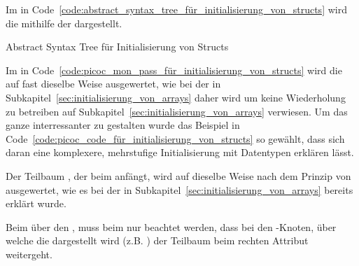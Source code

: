 Im  in Code~\ref{code:abstract_syntax_tree_für_initialisierung_von_structs} wird die   mithilfe der   dargestellt.

\begin{code}
  \centering
  \caption{Abstract Syntax Tree für Initialisierung von Structs}
  \label{code:abstract_syntax_tree_für_initialisierung_von_structs}
\end{code}


Im  in Code~\ref{code:picoc_mon_pass_für_initialisierung_von_structs} wird die   auf fast dieselbe Weise ausgewertet, wie bei der  in Subkapitel~\ref{sec:initialisierung_von_arrays} daher wird um keine Wiederholung zu betreiben auf Subkapitel~\ref{sec:initialisierung_von_arrays} verwiesen. Um das ganze interressanter zu gestalten wurde das Beispiel in Code~\ref{code:picoc_code_für_initialisierung_von_structs} so gewählt, dass sich daran eine komplexere, mehrstufige Initialisierung mit  Datentypen erklären lässt.

Der  Teilbaum , der beim   anfängt, wird auf dieselbe Weise nach dem  Prinzip von  ausgewertet, wie es bei der  in Subkapitel~\ref{sec:initialisierung_von_arrays} bereits erklärt wurde.

Beim  über den , muss beim  nur beachtet werden, dass bei den -Knoten, über welche die  dargestellt wird (z.B. ) der Teilbaum beim rechten  Attribut weitergeht.

